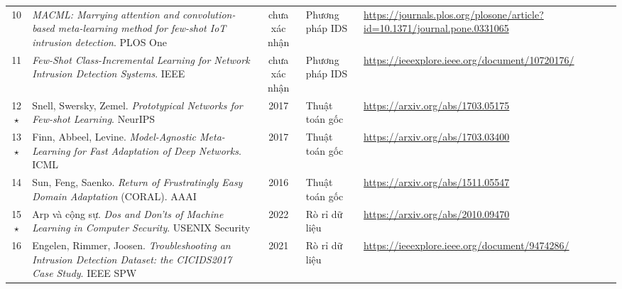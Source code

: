 \documentclass[10pt,a4paper,landscape]{article}
\begin{document}
\begin{tabularx}{\textwidth}{@{}c X c l p{8.2cm}@{}}
10 & \emph{MACML: Marrying attention and convolution-based meta-learning method for few-shot IoT intrusion detection}. PLOS One & chưa xác nhận & Phương pháp IDS & \url{https://journals.plos.org/plosone/article?id=10.1371/journal.pone.0331065} \\
11 & \emph{Few-Shot Class-Incremental Learning for Network Intrusion Detection Systems}. IEEE & chưa xác nhận & Phương pháp IDS & \url{https://ieeexplore.ieee.org/document/10720176/} \\
\midrule
12$\star$ & Snell, Swersky, Zemel. \emph{Prototypical Networks for Few-shot Learning}. NeurIPS & 2017 & Thuật toán gốc & \url{https://arxiv.org/abs/1703.05175} \\
13$\star$ & Finn, Abbeel, Levine. \emph{Model-Agnostic Meta-Learning for Fast Adaptation of Deep Networks}. ICML & 2017 & Thuật toán gốc & \url{https://arxiv.org/abs/1703.03400} \\
14 & Sun, Feng, Saenko. \emph{Return of Frustratingly Easy Domain Adaptation} (CORAL). AAAI & 2016 & Thuật toán gốc & \url{https://arxiv.org/abs/1511.05547} \\
\midrule
15$\star$ & Arp và cộng sự. \emph{Dos and Don'ts of Machine Learning in Computer Security}. USENIX Security & 2022 & Rò rỉ dữ liệu & \url{https://arxiv.org/abs/2010.09470} \\
16 & Engelen, Rimmer, Joosen. \emph{Troubleshooting an Intrusion Detection Dataset: the CICIDS2017 Case Study}. IEEE SPW & 2021 & Rò rỉ dữ liệu & \url{https://ieeexplore.ieee.org/document/9474286/} \\
\bottomrule
\end{tabularx}
\end{document}
